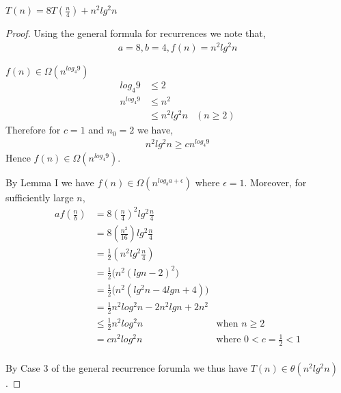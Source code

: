 \documentclass[12pt]{article}
\newenvironment{lemma}[2][Lemma]{\begin{trivlist}
\item[\hskip \labelsep {\bfseries #1}\hskip \labelsep {\bfseries #2.}]}{\end{trivlist}}
\newenvironment{question}[2][Question]{\begin{trivlist}
\item[\hskip \labelsep {\bfseries #1}\hskip \labelsep {\bfseries #2.}]}{\end{trivlist}}
\begin{document}
\begin{question}{5 (c)} $T(n) = 8T(\frac{n}{4}) + n^{2}lg^{2}n$
  \begin{proof}
    Using the general formula for recurrences we note that,
    \begin{align*}
      a = 8, b = 4, f(n) = n^{2}lg^{2}n
    \end{align*}

    \begin{lemma}{I} $f(n) \in \Omega(n^{log_{4}9})$
      \begin{align*}
        log_{4}9     & \leq 2&\\
        n^{log_{4}9} & \leq n^{2} &\\
                     & \leq n^{2}lg^{2}n & (n \geq 2)
      \end{align*}
      Therefore for $c = 1$ and $n_{0} = 2$ we have,
      \begin{align*}
        n^{2}lg^{2}n \geq cn^{log_{4}9}
      \end{align*}
      Hence $f(n) \in \Omega(n^{log_{4}9})$.
    \end{lemma}

    By Lemma I we have $f(n) \in \Omega(n^{log_{b}a + \epsilon})$ where $\epsilon = 1$.
    Moreover, for sufficiently large $n$,
    \begin{align*}
      af(\frac{n}{b}) & = 8(\frac{n}{4})^{2}lg^{2}\frac{n}{4}&\\
                      & = 8(\frac{n^{2}}{16})lg^{2}\frac{n}{4}&\\
                      & = \frac{1}{2}(n^{2}lg^{2}\frac{n}{4})&\\
                      & = \frac{1}{2} \bigl(n^{2}(lgn - 2)^{2}\bigr) &\\
                      & = \frac{1}{2} \bigl(n^{2}(lg^{2}n - 4lgn + 4)\bigr) &\\
                      & = \frac{1}{2}n^{2}log^{2}n - 2n^{2}lgn + 2n^{2}&\\
                      & \leq \frac{1}{2}n^{2}log^{2}n & \text{when $n \geq 2$}\\
                      & = cn^{2}log^{2}n & \text{where $0 < c = \frac{1}{2} < 1$}\\
    \end{align*}

    By Case 3 of the general recurrence forumla we thus have $T(n) \in \theta(n^{2}lg^{2}n)$.
  \end{proof}
\end{question}
\end{document}

